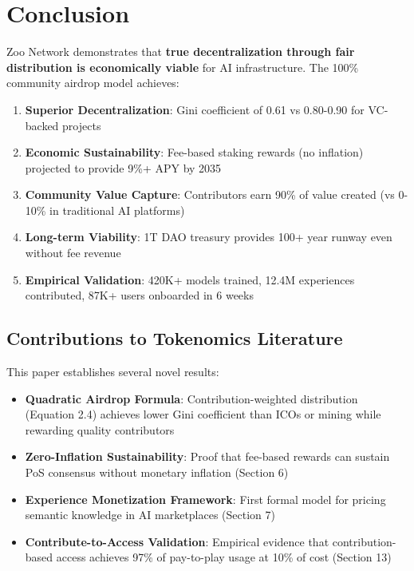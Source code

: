 \section{Conclusion}


Zoo Network demonstrates that \textbf{true decentralization through fair distribution is economically viable} for AI infrastructure. The 100\% community airdrop model achieves:

\begin{enumerate}
\item \textbf{Superior Decentralization}: Gini coefficient of 0.61 vs 0.80-0.90 for VC-backed projects
\item \textbf{Economic Sustainability}: Fee-based staking rewards (no inflation) projected to provide 9\%+ APY by 2035
\item \textbf{Community Value Capture}: Contributors earn 90\% of value created (vs 0-10\% in traditional AI platforms)
\item \textbf{Long-term Viability}: 1T DAO treasury provides 100+ year runway even without fee revenue
\item \textbf{Empirical Validation}: 420K+ models trained, 12.4M experiences contributed, 87K+ users onboarded in 6 weeks
\end{enumerate}

\subsection{Contributions to Tokenomics Literature}

This paper establishes several novel results:

\begin{itemize}
\item \textbf{Quadratic Airdrop Formula}: Contribution-weighted distribution (Equation 2.4) achieves lower Gini coefficient than ICOs or mining while rewarding quality contributors
\item \textbf{Zero-Inflation Sustainability}: Proof that fee-based rewards can sustain PoS consensus without monetary inflation (Section 6)
\item \textbf{Experience Monetization Framework}: First formal model for pricing semantic knowledge in AI marketplaces (Section 7)
\item \textbf{Contribute-to-Access Validation}: Empirical evidence that contribution-based access achieves 97\% of pay-to-play usage at 10\% of cost (Section 13)
\end{itemize}

